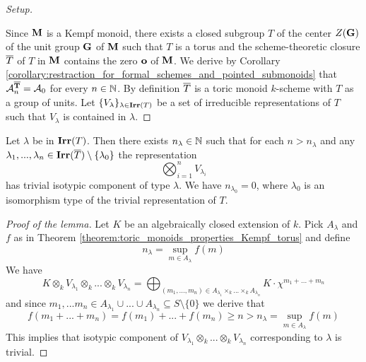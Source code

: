 \begin{proof}[Setup]
\begin{enumerate}[label=\textbf{(\arabic*)}, leftmargin=3.0em]
\end{enumerate}
Since $\mathbf{M}$ is a Kempf monoid, there exists a closed subgroup $T$ of the center $Z(\mathbf{G})$ of the unit group $\mathbf{G}$ of $\mathbf{M}$ such that $T$ is a torus and the scheme-theoretic closure $\overline{T}$ of $T$ in $\mathbf{M}$ contains the zero $\mathbf{o}$ of $\mathbf{M}$. We derive by Corollary \ref{corollary:restraction_for_formal_schemes_and_pointed_submonoids} that ${\mathcal A}_n^{\mathbf{\overline{T}}} = {\mathcal A}_0$ for every $n\in {\mathbb N}$. By definition $\overline{T}$ is a toric monoid $k$-scheme with $T$ as a group of units. Let $\{V_{\lambda}\}_{\lambda\in \mathbf{Irr}(T)}$ be a set of irreducible representations of $T$ such that $V_{\lambda}$ is contained in $\lambda$.
\end{proof}

\begin{lemma}\label{lemma:stablization_for_representations}
Let $\lambda$ be in $\mathbf{Irr}(T)$. Then there exists $n_{\lambda}\in {\mathbb N}$ such that for each $n > n_{\lambda}$ and any $\lambda_1,...,\lambda_n\in \mathbf{Irr}(\overline{T})\setminus \{\lambda_0\}$ the representation
$$\bigotimes_{i=1}^nV_{\lambda_i}$$ 
has trivial isotypic component of type $\lambda$. We have $n_{\lambda_0} = 0$, where $\lambda_0$ is an isomorphism type of the trivial representation of $T$.
\end{lemma}
\begin{proof}[Proof of the lemma]
Let $K$ be an algebraically closed extension of $k$. Pick $A_{\lambda}$ and $f$ as in Theorem \ref{theorem:toric_monoids_properties_Kempf_torus} and define
$$n_{\lambda} = \sup_{m\in A_{\lambda}}f(m)$$
We have
$$K\otimes_kV_{\lambda_1}\otimes_k...\otimes_kV_{\lambda_n} = \bigoplus_{(m_1,...,m_n)\in A_{\lambda_1}\times_k ...\times_k A_{\lambda_n}}K\cdot \chi^{m_1+...+m_n}$$
and since $m_1,...m_n\in A_{\lambda_1}\cup ...\cup A_{\lambda_n}\subseteq S\setminus \{0\}$ we derive that
$$f(m_1+...+m_n) = f(m_1) + ... + f(m_n) \geq n > n_{\lambda} = \sup_{m\in A_{\lambda}}f(m)$$
This implies that isotypic component of $V_{\lambda_1}\otimes_k...\otimes_kV_{\lambda_n}$ corresponding to $\lambda$ is trivial.
\end{proof}

